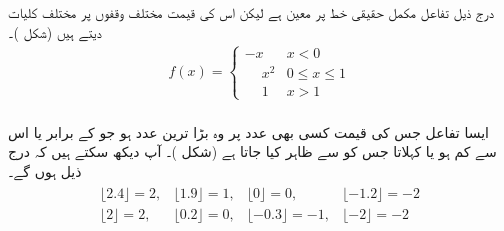 درج ذیل تفاعل مکمل حقیقی خط پر معین ہے لیکن اس کی قیمت مختلف وقفوں پر مختلف کلیات دیتے ہیں (شکل )۔
\begin{align*}
f(x)=
\begin{cases}
-x&x<0\\
\phantom{-}x^2&0\le x\le 1\\
\phantom{-}1&x>1
\end{cases}
\end{align*}
\\
ایسا تفاعل جس کی قیمت کسی بھی عدد  پر وہ بڑا ترین عدد ہو جو  کے برابر یا اس سے کم ہو   یا  کہلاتا جس کو  سے ظاہر کیا جاتا ہے (شکل )۔  آپ دیکھ سکتے ہیں کہ درج ذیل ہوں گے۔
\begin{align*}
\begin{array}{llll}
\lfloor 2.4 \rfloor=2,& \lfloor 1.9\rfloor=1,& \lfloor 0 \rfloor=0, & \lfloor -1.2\rfloor=-2\\
\lfloor 2\rfloor=2,& \lfloor 0.2\rfloor =0,& \lfloor -0.3\rfloor =-1,& \lfloor -2\rfloor=-2
\end{array}
\end{align*}
%
